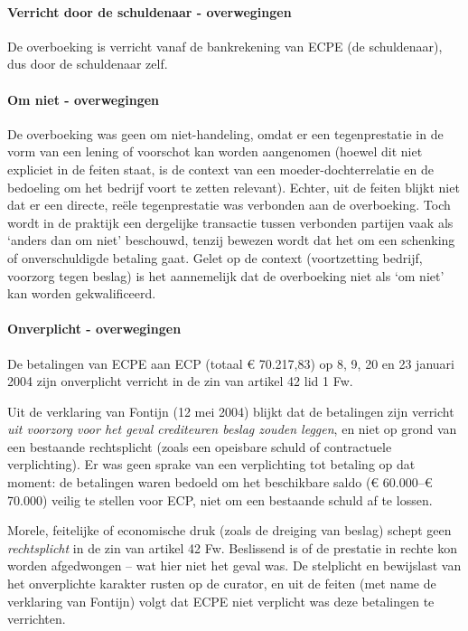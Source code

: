 \documentclass[
  dutch,
  a4paper,
]{article}
\begin{document}
\paragraph{Verricht door de schuldenaar - overwegingen}\label{verricht-door-de-schuldenaar---overwegingen-51}

De overboeking is verricht vanaf de bankrekening van ECPE (de schuldenaar), dus door de schuldenaar zelf.

\paragraph{Om niet - overwegingen}\label{om-niet---overwegingen-51}

De overboeking was geen om niet-handeling, omdat er een tegenprestatie in de vorm van een lening of voorschot kan worden aangenomen (hoewel dit niet expliciet in de feiten staat, is de context van een moeder-dochterrelatie en de bedoeling om het bedrijf voort te zetten relevant). Echter, uit de feiten blijkt niet dat er een directe, reële tegenprestatie was verbonden aan de overboeking. Toch wordt in de praktijk een dergelijke transactie tussen verbonden partijen vaak als `anders dan om niet' beschouwd, tenzij bewezen wordt dat het om een schenking of onverschuldigde betaling gaat. Gelet op de context (voortzetting bedrijf, voorzorg tegen beslag) is het aannemelijk dat de overboeking niet als `om niet' kan worden gekwalificeerd.

\paragraph{Onverplicht - overwegingen}\label{onverplicht---overwegingen-51}

De betalingen van ECPE aan ECP (totaal € 70.217,83) op 8, 9, 20 en 23 januari 2004 zijn onverplicht verricht in de zin van artikel 42 lid 1 Fw.

Uit de verklaring van Fontijn (12 mei 2004) blijkt dat de betalingen zijn verricht \emph{uit voorzorg voor het geval crediteuren beslag zouden leggen}, en niet op grond van een bestaande rechtsplicht (zoals een opeisbare schuld of contractuele verplichting). Er was geen sprake van een verplichting tot betaling op dat moment: de betalingen waren bedoeld om het beschikbare saldo (€ 60.000--€ 70.000) veilig te stellen voor ECP, niet om een bestaande schuld af te lossen.

Morele, feitelijke of economische druk (zoals de dreiging van beslag) schept geen \emph{rechtsplicht} in de zin van artikel 42 Fw. Beslissend is of de prestatie in rechte kon worden afgedwongen -- wat hier niet het geval was. De stelplicht en bewijslast van het onverplichte karakter rusten op de curator, en uit de feiten (met name de verklaring van Fontijn) volgt dat ECPE niet verplicht was deze betalingen te verrichten.
\end{document}
